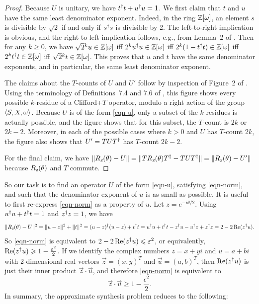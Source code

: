 \documentclass{article}
\begin{document}
\begin{proof}
  Because $U$ is unitary, we have $t^{\dagger} t+u^{\dagger} u=1$. We first claim
  that $t$ and $u$ have the same least denominator exponent. Indeed,
  in the ring $\mathbb{Z}[\omega]$, an element $s$ is divisible by $\sqrt2$ if and
  only if ${s}^{\dagger} s$ is divisible by 2. The left-to-right implication
  is obvious, and the right-to-left implication follows, e.g., from
  Lemma~2 of {\cite{Giles-Selinger}}. Then for any $k\geq 0$, we have
  $\sqrt{2}{}^{k}u\in\mathbb{Z}[\omega]$ iff $2^k{u}^{\dagger} u\in\mathbb{Z}[\omega]$ iff
  $2^k(1-{t}^{\dagger} t)\in\mathbb{Z}[\omega]$ iff $2^k{t}^{\dagger} {t}\in\mathbb{Z}[\omega]$ iff
  $\sqrt{2}{}^{k}{t}\in\mathbb{Z}[\omega]$. This proves that $u$ and $t$ have the same
  denominator exponents, and in particular, the same least denominator
  exponent.

  The claims about the $T$-counts of $U$ and $U'$ follow by inspection
  of Figure~2 of {\cite{ma-remarks}}. Using the terminology of
  Definitions~7.4 and 7.6 of {\cite{ma-remarks}}, this figure shows
  every possible $k$-residue of a Clifford+$T$ operator, modulo a
  right action of the group $\langle S,X,\omega\rangle$. Because $U$ is
  of the form {\eqref{eqn-u}}, only a subset of the $k$-residues is
  actually possible, and the figure shows that for this subset, the
  $T$-count is $2k$ or $2k-2$. Moreover, in each of the possible cases
  where $k>0$ and $U$ has $T$-count $2k$, the figure also shows that
  $U'=TUT^{\dagger}$ has $T$-count $2k-2$.

  For the final claim, we have $\|R_{\textsl{z}}(\theta) -
    U\|=\|TR_{\textsl{z}}(\theta)T^{\dagger} - TUT^{\dagger}\| = \|R_{\textsl{z}}(\theta) - U'\|$
  because $R_{\textsl{z}}(\theta)$ and $T$ commute.
\end{proof}

So our task is to find an operator $U$ of the form {\eqref{eqn-u}},
satisfying {\eqref{eqn-norm}}, and such that the denominator exponent 
of $u$ is as small as possible. It is useful to first re-express 
{\eqref{eqn-norm}} as a property of $u$. Let $z=e^{-i\theta/2}$. Using
$u^{\dagger} u+t^{\dagger} t=1$ and $z^{\dagger} z=1$, we have
\[ \|R_{\textsl{z}}(\theta) - U\|^2
  = \|u-z\|^2 + \|t\|^2
  = (u-z)^{\dagger}(u-z) + {t}^{\dagger} t
  = {u}^{\dagger} u+{t}^{\dagger} t - z^{\dagger} u - {u}^{\dagger} z + z^{\dagger} z
  = 2 - 2\mathop{{\rm Re}}(z^{\dagger} u).
\]
So {\eqref{eqn-norm}} is equivalent to $2 - 2\mathop{{\rm Re}}(z^{\dagger} u)\leqslant
\varepsilon^2$, or equivalently, $\mathop{{\rm Re}}(z^{\dagger} u) \geqslant 1 -
\frac{\varepsilon^2}{2}$. If we identify the complex numbers $z=x+yi$ and
$u=a+bi$ with 2-dimensional real vectors $\vec z = (x,y)^T$ and $\vec u
= (a,b)^T$, then $\mathop{{\rm Re}}(z^{\dagger} u)$ is just their inner product $\vec
z\cdot \vec u$, and therefore {\eqref{eqn-norm}} is equivalent to
\begin{equation}\label{eqn-zu}
  \vec z\cdot \vec u \geq 1 - \frac{\epsilon^2}{2}.
\end{equation}
In summary, the approximate synthesis problem reduces to the following:
\end{document}
